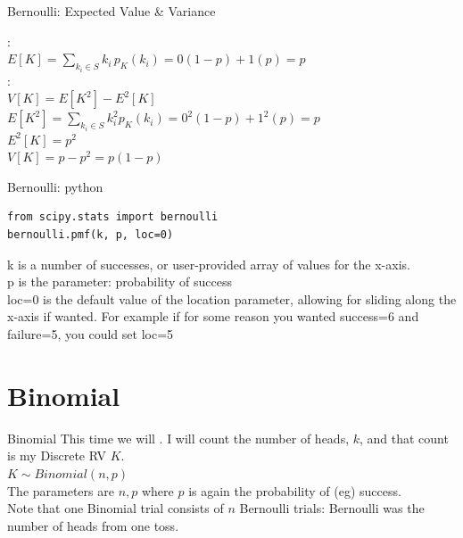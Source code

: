 \documentclass[10pt,sans,english,compress,xcolor=dvipsnames]{beamer}
\begin{document}
\begin{frame}{Bernoulli: Expected Value \& Variance}

: \\[1ex]
$E[K]  = \sum\limits_{k_i \in S} k_i \,p_K(k_i)  = 0(1-p) + 1(p) = p$\\[1ex]

:\\[1ex]
$V[K]  =E[K^2]-E^2[K] $\\[1ex]
$E[K^2]  = \sum\limits_{k_i \in S} k^2_i p_K(k_i)  = 0^2(1-p) + 1^2(p) = p$\\[1ex]
$E^2[K] =p^2$\\[1ex]
$V[K]  = p-p^2 = p(1-p)$\\[1ex]

\end{frame} 

\begin{frame}[fragile]{Bernoulli: python}

\begin{verbatim}
from scipy.stats import bernoulli
bernoulli.pmf(k, p, loc=0) 
\end{verbatim}
\vspace{0.5cm}

k is a number of successes, or user-provided array of values for the x-axis.\\[1ex]
p is the parameter: probability of success\\[1ex]
loc=0 is the default value of the location parameter, allowing for sliding along the x-axis if wanted. For example if for some reason you wanted success=6 and failure=5, you could set loc=5\\

\end{frame} 







\section{Binomial}

 
\begin{frame}{Binomial}
This time we will . I will count the number of heads, $k$, and that count is my Discrete RV $K$.\\[1ex]

$K\sim Binomial(n,p)$\\[1ex] 

The parameters are $n,p$ where $p$ is again the probability of (eg) success.\\[1ex]

Note that one Binomial trial consists of $n$ Bernoulli trials: Bernoulli was the number of heads from one toss.\\[1ex]

\end{frame} 
\end{document}
